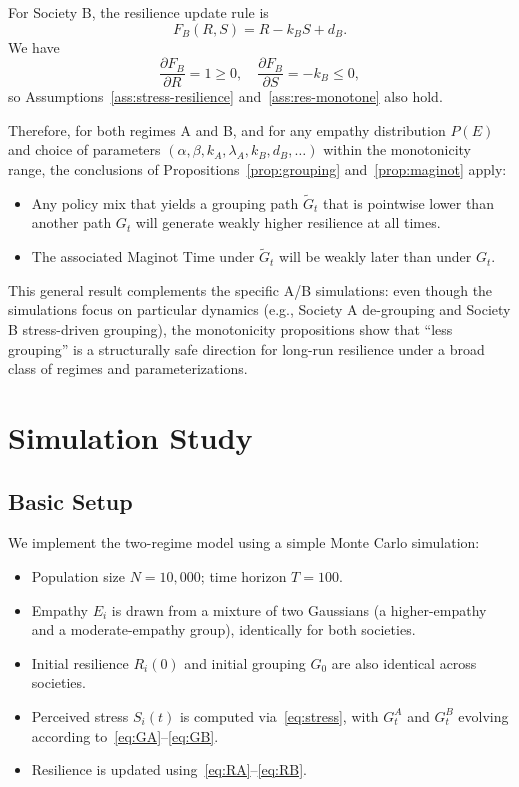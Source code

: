 \documentclass[11pt]{article}
\theoremstyle{plain}
\begin{document}
For Society B, the resilience update rule is
\[
F_B(R,S) = R - k_B S + d_B.
\]
We have
\[
\frac{\partial F_B}{\partial R} = 1 \ge 0, \quad
\frac{\partial F_B}{\partial S} = -k_B \le 0,
\]
so Assumptions~\ref{ass:stress-resilience} and~\ref{ass:res-monotone} also hold.

Therefore, for both regimes A and B, and for any empathy distribution $P(E)$ and choice of parameters $(\alpha,\beta,k_A,\lambda_A,k_B,d_B,\dots)$ within the monotonicity range, the conclusions of Propositions~\ref{prop:grouping} and~\ref{prop:maginot} apply:
\begin{itemize}
  \item Any policy mix that yields a grouping path $\tilde{G}_t$ that is pointwise lower than another path $G_t$ will generate weakly higher resilience at all times.
  \item The associated Maginot Time under $\tilde{G}_t$ will be weakly later than under $G_t$.
\end{itemize}

This general result complements the specific A/B simulations:
even though the simulations focus on particular dynamics (e.g., Society A de-grouping and Society B stress-driven grouping), the monotonicity propositions show that ``less grouping'' is a structurally safe direction for long-run resilience under a broad class of regimes and parameterizations.

\section{Simulation Study}
\label{sec:simulation}

\subsection{Basic Setup}

We implement the two-regime model using a simple Monte Carlo simulation:
\begin{itemize}
  \item Population size $N = 10{,}000$; time horizon $T = 100$.
  \item Empathy $E_i$ is drawn from a mixture of two Gaussians (a higher-empathy and a moderate-empathy group), identically for both societies.
  \item Initial resilience $R_i(0)$ and initial grouping $G_0$ are also identical across societies.
  \item Perceived stress $S_i(t)$ is computed via~\eqref{eq:stress}, with $G_t^A$ and $G_t^B$ evolving according to~\eqref{eq:GA}--\eqref{eq:GB}.
  \item Resilience is updated using~\eqref{eq:RA}--\eqref{eq:RB}.
\end{itemize}
\end{document}

